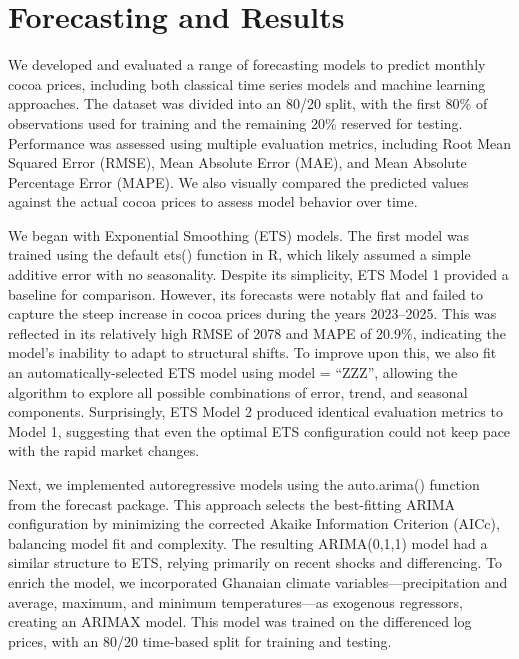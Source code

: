 \documentclass[
  letterpaper,
  DIV=11,
  numbers=noendperiod]{scrartcl}
\begin{document}
\hypertarget{forecasting-and-results}{%
\section{Forecasting and Results}\label{forecasting-and-results}}

We developed and evaluated a range of forecasting models to predict
monthly cocoa prices, including both classical time series models and
machine learning approaches. The dataset was divided into an 80/20
split, with the first 80\% of observations used for training and the
remaining 20\% reserved for testing. Performance was assessed using
multiple evaluation metrics, including Root Mean Squared Error (RMSE),
Mean Absolute Error (MAE), and Mean Absolute Percentage Error (MAPE). We
also visually compared the predicted values against the actual cocoa
prices to assess model behavior over time.

We began with Exponential Smoothing (ETS) models. The first model was
trained using the default ets() function in R, which likely assumed a
simple additive error with no seasonality. Despite its simplicity, ETS
Model 1 provided a baseline for comparison. However, its forecasts were
notably flat and failed to capture the steep increase in cocoa prices
during the years 2023--2025. This was reflected in its relatively high
RMSE of 2078 and MAPE of 20.9\%, indicating the model's inability to
adapt to structural shifts. To improve upon this, we also fit an
automatically-selected ETS model using model = ``ZZZ'', allowing the
algorithm to explore all possible combinations of error, trend, and
seasonal components. Surprisingly, ETS Model 2 produced identical
evaluation metrics to Model 1, suggesting that even the optimal ETS
configuration could not keep pace with the rapid market changes.

Next, we implemented autoregressive models using the auto.arima()
function from the forecast package. This approach selects the
best-fitting ARIMA configuration by minimizing the corrected Akaike
Information Criterion (AICc), balancing model fit and complexity. The
resulting ARIMA(0,1,1) model had a similar structure to ETS, relying
primarily on recent shocks and differencing. To enrich the model, we
incorporated Ghanaian climate variables---precipitation and average,
maximum, and minimum temperatures---as exogenous regressors, creating an
ARIMAX model. This model was trained on the differenced log prices, with
an 80/20 time-based split for training and testing.
\end{document}
